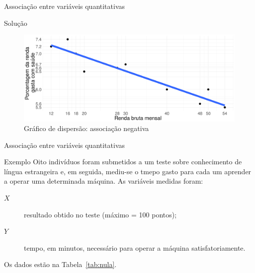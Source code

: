 \documentclass[9pt]{beamer}
\begin{document}
\begin{frame}{Associação entre variáveis quantitativas}

\begin{block}{Solução}
	\begin{figure}[htbp]
		\centering
		\includegraphics[width = 1.05\linewidth]{figures/negativa.png}
		\caption{Gráfico de dispersão: associação negativa}
		\label{tab:associacao-negativa}
	\end{figure}	
\end{block}

\end{frame}

\begin{frame}{Associação entre variáveis quantitativas}

\begin{block}{Exemplo}
	Oito indivíduos foram submetidos a um teste sobre conhecimento de língua estrangeira e, em seguida, mediu-se o tmepo gasto para cada um aprender a operar uma determinada máquina. As variáveis medidas foram:
	\begin{description}
		\item[$X$] resultado obtido no teste (máximo = 100 pontos);
		\item[$Y$] tempo, em minutos, necessário para operar a máquina satisfatoriamente.
	\end{description}
	Os dados estão na Tabela~\ref{tab:nula}.
	\begin{table}[ht]
		\centering
		\caption{Amostra de famílias.} 
		\label{tab:nula}
	\end{table}	
\end{block}

\end{frame}
\end{document}
